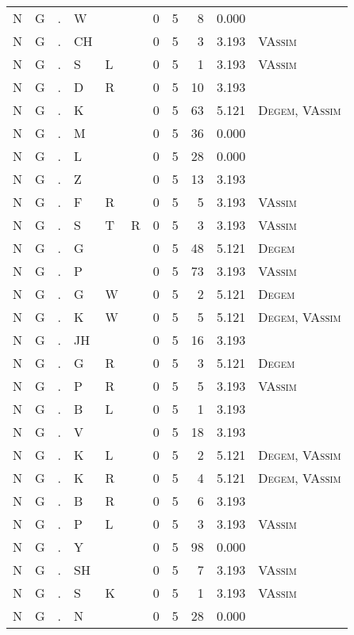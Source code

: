 \begin{longtable}{r@{ } r@{ } c@{ } l@{ } l@{ } l@{ } r r r r l }
N & G & . & W &  &  & 0 & 5 & 8 & 0.000 &  \\
N & G & . & CH &  &  & 0 & 5 & 3 & 3.193 & \textsc{VAssim} \\
N & G & . & S & L &  & 0 & 5 & 1 & 3.193 & \textsc{VAssim} \\
N & G & . & D & R &  & 0 & 5 & 10 & 3.193 &  \\
N & G & . & K &  &  & 0 & 5 & 63 & 5.121 & \textsc{Degem}, \textsc{VAssim} \\
N & G & . & M &  &  & 0 & 5 & 36 & 0.000 &  \\
N & G & . & L &  &  & 0 & 5 & 28 & 0.000 &  \\
N & G & . & Z &  &  & 0 & 5 & 13 & 3.193 &  \\
N & G & . & F & R &  & 0 & 5 & 5 & 3.193 & \textsc{VAssim} \\
N & G & . & S & T & R & 0 & 5 & 3 & 3.193 & \textsc{VAssim} \\
N & G & . & G &  &  & 0 & 5 & 48 & 5.121 & \textsc{Degem} \\
N & G & . & P &  &  & 0 & 5 & 73 & 3.193 & \textsc{VAssim} \\
N & G & . & G & W &  & 0 & 5 & 2 & 5.121 & \textsc{Degem} \\
N & G & . & K & W &  & 0 & 5 & 5 & 5.121 & \textsc{Degem}, \textsc{VAssim} \\
N & G & . & JH &  &  & 0 & 5 & 16 & 3.193 &  \\
N & G & . & G & R &  & 0 & 5 & 3 & 5.121 & \textsc{Degem} \\
N & G & . & P & R &  & 0 & 5 & 5 & 3.193 & \textsc{VAssim} \\
N & G & . & B & L &  & 0 & 5 & 1 & 3.193 &  \\
N & G & . & V &  &  & 0 & 5 & 18 & 3.193 &  \\
N & G & . & K & L &  & 0 & 5 & 2 & 5.121 & \textsc{Degem}, \textsc{VAssim} \\
N & G & . & K & R &  & 0 & 5 & 4 & 5.121 & \textsc{Degem}, \textsc{VAssim} \\
N & G & . & B & R &  & 0 & 5 & 6 & 3.193 &  \\
N & G & . & P & L &  & 0 & 5 & 3 & 3.193 & \textsc{VAssim} \\
N & G & . & Y &  &  & 0 & 5 & 98 & 0.000 &  \\
N & G & . & SH &  &  & 0 & 5 & 7 & 3.193 & \textsc{VAssim} \\
N & G & . & S & K &  & 0 & 5 & 1 & 3.193 & \textsc{VAssim} \\
N & G & . & N &  &  & 0 & 5 & 28 & 0.000 &  \\

\end{longtable}
